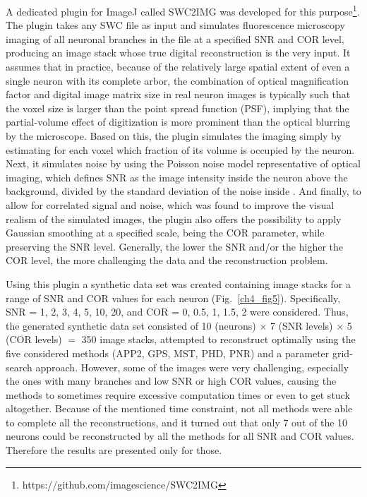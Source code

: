 A dedicated plugin for ImageJ \cite{schneider2012nih} called SWC2IMG was developed for this purpose\footnote{https://github.com/imagescience/SWC2IMG}. The plugin takes any SWC file as input and simulates fluorescence microscopy imaging of all neuronal branches in the file at a specified SNR and COR level, producing an image stack whose true digital reconstruction is the very input. It assumes that in practice, because of the relatively large spatial extent of even a single neuron with its complete arbor, the combination of optical magnification factor and digital image matrix size in real neuron images is typically such that the voxel size is larger than the point spread function (PSF), implying that the partial-volume effect of digitization is more prominent than the optical blurring by the microscope. Based on this, the plugin simulates the imaging simply by estimating for each voxel which fraction of its volume is occupied by the neuron. Next, it simulates noise by using the Poisson noise model representative of optical imaging, which defines SNR as the image intensity inside the neuron above the background, divided by the standard deviation of the noise inside \cite{sheppard2006signal}. And finally, to allow for correlated signal and noise, which was found to improve the visual realism of the simulated images, the plugin also offers the possibility to apply Gaussian smoothing at a specified scale, being the COR parameter, while preserving the SNR level. Generally, the lower the SNR and/or the higher the COR level, the more challenging the data and the reconstruction problem.

Using this plugin a synthetic data set was created containing image stacks for a range of SNR and COR values for each neuron (Fig.~\ref{ch4_fig5}). Specifically, SNR = 1, 2, 3, 4, 5, 10, 20, and COR = 0, 0.5, 1, 1.5, 2 were considered. Thus, the generated synthetic data set consisted of 10 (neurons) $\times$ 7 (SNR levels) $\times$ 5 (COR levels) $=$ 350 image stacks, attempted to reconstruct optimally using the five considered methods (APP2, GPS, MST, PHD, PNR) and a parameter grid-search approach. However, some of the images were very challenging, especially the ones with many branches and low SNR or high COR values, causing the methods to sometimes require excessive computation times or even to get stuck altogether. Because of the mentioned time constraint, not all methods were able to complete all the reconstructions, and it turned out that only 7 out of the 10 neurons could be reconstructed by all the methods for all SNR and COR values. Therefore the results are presented only for those.


